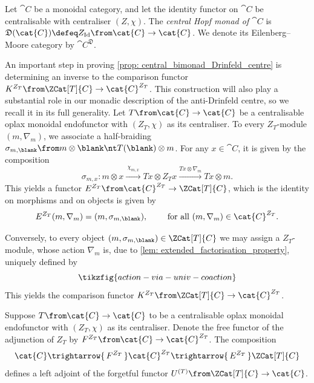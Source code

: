 \begin{definition}\label{def: central_bimonad}
  Let \(\cat{C}\) be a monoidal category,
  and let the identity functor on \(\cat{C}\) be centralisable with centraliser \((Z, \chi)\).
  The \emph{central Hopf monad of \(\cat{C}\)}
  is
  \(\mathfrak{D}(\cat{C}) \defeq Z_{\mathrm{Id}} \from \cat{C} \to \cat{C}\).
  We denote its Eilenberg–Moore category by \(\cat{C}^{\mathfrak{D}}\).
\end{definition}

An important step in proving \cref{prop: central_bimonad_Drinfeld_centre}
is determining an inverse to the comparison functor \(K^{Z_T}\from \ZCat[T]{C} \to \cat{C}^{Z_T}\).
This construction will also play a substantial role in our monadic description of the anti\hyp{}Drinfeld centre,
so we recall it in its full generality.
Let \(T \from \cat{C} \to \cat{C}\) be a centralisable oplax monoidal endofunctor
with \((Z_T, \chi)\) as its centraliser.
To every \(Z_T\)\hyp{}module \((m, \nabla_m)\),
we associate a half-braiding \(\sigma_{m, \blank} \from m \otimes \blank \nt T(\blank) \otimes m\).
For any \(x \in \cat{C}\), it is given by the composition
\begin{equation}\label{eq: free_half_braiding}
  \sigma_{m, x} \colon m \otimes x \xrightarrow{\ \chi_{m,x}\ } Tx \otimes Z_T x \xrightarrow{Tx \otimes \nabla_m} Tx \otimes m.
\end{equation}
This yields a functor \(E^{Z_T}\from \cat{C}^{Z_T} \to \ZCat[T]{C}\),
which is the identity on morphisms and on objects is given by
\begin{equation}\label{eq: inverse_comparison_functor}
  E^{Z_T}(m, \nabla_{m}) = (m, \sigma_{m,\blank}), \qquad \text{ for all }(m, \nabla_{m}) \in \cat{C}^{Z_T}.
\end{equation}

Conversely, to every object \((m, \sigma_{m, \blank}) \in \ZCat[T]{C}\)
we may assign a \(Z_T\)\hyp{}module,
whose action \(\nabla_m\) is,
due to \cref{lem: extended_factorisation_property},
uniquely defined by
\[
  \tikzfig{action-via-univ-coaction}
\]
This yields the comparison functor \(K^{Z_T}\from \ZCat[T]{C} \to \cat{C}^{Z_T}\).

\begin{remark}\label{rem: adjoint_from_inverse_of_the_comparison_functor}
  Suppose \(T \from \cat{C} \to \cat{C}\) to be a centralisable oplax monoidal endofunctor
  with  \((Z_T, \chi)\) as its centraliser.
  Denote the free functor of the \EilenbergMoore{} adjunction of \(Z_T\) by \(F^{Z_T} \from \cat{C} \to \cat{C}^{Z_T}\).
  The composition
  \[
    \cat{C} \trightarrow{\,F^{Z_T}\,} \cat{C}^{Z_T} \trightarrow{\,E^{Z_T}\,}  \ZCat[T]{C}
  \]
  defines a left adjoint of the forgetful functor \(U^{(T)} \from \ZCat[T]{C} \to \cat{C}\).
\end{remark}

